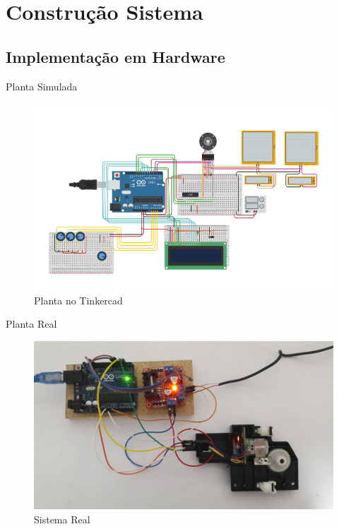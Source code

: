 \documentclass{beamer}
\begin{document}
\section{Construção Sistema}

\subsection{Implementação em Hardware}

\begin{frame}{Planta Simulada}
\begin{figure}
    \centering
    \includegraphics[width = \linewidth]{src/tex/img/pid_tinkercad.png}
    \caption{Planta no Tinkercad}
    \label{fig:control_1}
\end{figure}
\end{frame}

\begin{frame}{Planta Real}
\begin{figure}
    \centering
    \includegraphics[width = \linewidth]{src/tex/img/full_system.jpg}
    \caption{Sistema Real}
    \label{fig:control_1}
\end{figure}
\end{frame}
\end{document}
